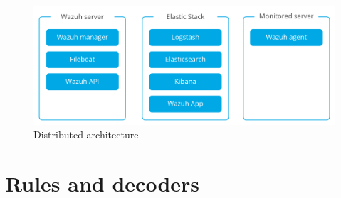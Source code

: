 \begin{figure}[H]
  \centering
	\includegraphics[width=\textwidth]{figuras/wazuh_distributed.png}
	\caption{Distributed architecture}
\end{figure}




\section{Rules and decoders}
